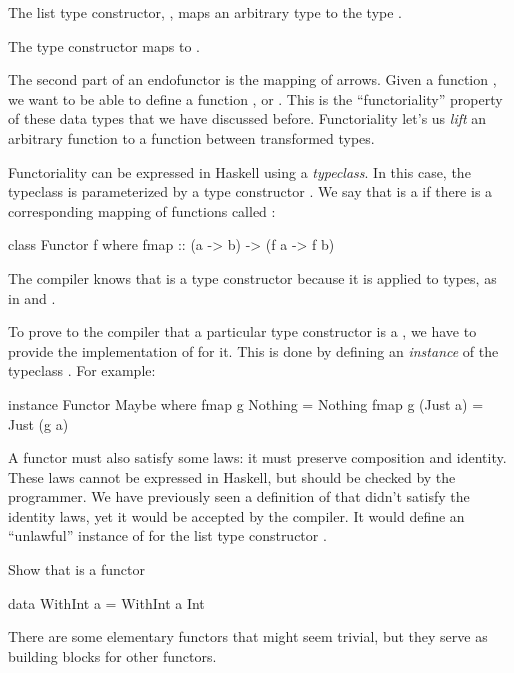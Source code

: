 \documentclass[DaoFP]{subfiles}
\begin{document}
The list type constructor, , maps an arbitrary type  to the type .

The  type constructor maps  to .

The second part of an endofunctor is the mapping of arrows. Given a function , we want to be able to define a function , or . This is the ``functoriality'' property of these data types that we have discussed before. Functoriality let's us \emph{lift} an arbitrary function to a function between transformed types.

Functoriality can be expressed in Haskell using a \emph{typeclass}. In this case, the typeclass is parameterized by a type constructor . We say that  is a  if there is a corresponding mapping of functions called :
\begin{haskell}
class Functor f where
  fmap :: (a -> b) -> (f a -> f b)
\end{haskell}
The compiler knows that  is a type constructor because it is applied to types, as in  and .

To prove to the compiler that a particular type constructor is a , we have to provide the implementation of  for it. This is done by defining an \emph{instance} of the typeclass . For example:
\begin{haskell}
instance Functor Maybe where
  fmap g Nothing  = Nothing
  fmap g (Just a) = Just (g a)
\end{haskell}

A functor must also satisfy some laws: it must preserve composition and identity. These laws cannot be expressed in Haskell, but should be checked by the programmer. We have previously seen a definition of  that didn't satisfy the identity laws, yet it would be accepted by the compiler. It would define an ``unlawful'' instance of  for the list type constructor \hask{[]}.

\begin{exercise}
Show that  is a functor
\begin{haskell}
data WithInt a = WithInt a Int
\end{haskell}
\end{exercise}

There are some elementary functors that might seem trivial, but they serve as building blocks for other functors. 
\end{document}
